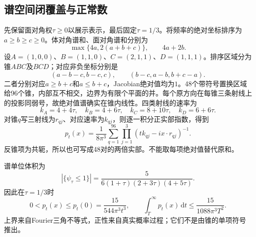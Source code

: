 \documentclass[UTF8,11pt,a4paper,fontset=fandol]{ctexart}
\theoremstyle{definition}\newtheorem{definition}[theorem]{定义}
\theoremstyle{remark}\newtheorem{remark}[theorem]{注}
\newcommand{\dd}{\,\mathrm d}
\newcommand{\abs}[1]{\left|#1\right|}
\begin{document}
\subsection{谱空间闭覆盖与正常数}
先保留面对角权$\tau\ge0$以展示表示，最后固定$\tau=1/3$。将频率的绝对坐标排序为$a\ge b\ge c\ge0$。体对角谱和、面对角谱和分别为
\[
 \max\{4a,2(a+b+c)\},\qquad4a+2b.
\]
设$A=(1,0,0)$、$B=(1,1,0)$、$C=(2,1,1)$、$D=(1,1,1)$。排序区域分为锥$ABC$及$BCD$；对应非负坐标分别是
\[
 (a-b-c,b-c,c),\qquad(b-c,a-b,b+c-a).
\]
二者分别对应$a\ge b+c$和$a\le b+c$，Jacobian绝对值均为$1$。48个带符号置换区域给96个锥，内部互不相交，边界为有限个平面的并。每个原方向在每锥三条射线上的投影同弱号，故绝对值谱确实在锥内线性。四类射线的速率为
\begin{equation}\label{eq:rates}
 k_A=4+4\tau,\quad k_B=4+6\tau,\quad
 k_C=8+10\tau,\quad k_D=6+6\tau.
\end{equation}
对锥$q$写三射线为$r_{qj}$、对应速率为$k_{qj}$，则逐一积分正实部指数，得到
\begin{equation}\label{eq:heatcones}
 p_t(x)=\frac1{8\pi^3}\sum_{q=1}^{96}
 \prod_{j=1}^3(tk_{qj}-ix\cdot r_{qj})^{-1}.
\end{equation}
反锥项为共轭，所以也可写成48对的两倍实部。不能取每项绝对值替代原和。

谱单位体积为
\[
 \abs{\{\psi_\tau\le1\}}=
 \frac5{6(1+\tau)(2+3\tau)(4+5\tau)}.
\]
因此在$\tau=1/3$时
\begin{equation}\label{eq:peak}
 0<p_t(x)\le p_t(0)=\frac{15}{544\pi^3t^3},
 \qquad \int_T^\infty p_t(x)\dd t\le\frac{15}{1088\pi^3T^2}.
\end{equation}
上界来自Fourier三角不等式，正性来自真实概率过程；它们不是由锥的单项符号推出。
\end{document}
